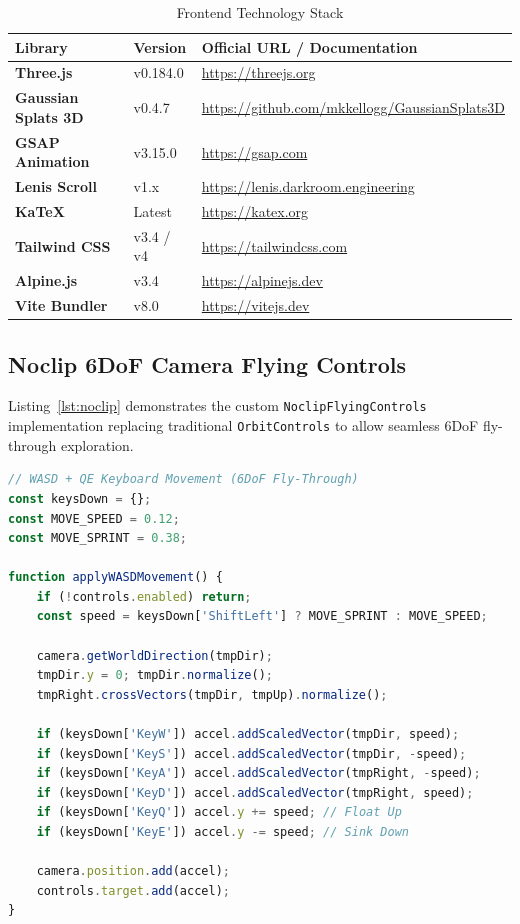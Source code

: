 \documentclass[11pt, a4paper]{article}
\begin{document}
\begin{table}[H]
\centering
\caption{Frontend Technology Stack}
\label{tab:tools_frontend}
\begin{tabularx}{\textwidth}{l l X}
\toprule
\textbf{Library} & \textbf{Version} & \textbf{Official URL / Documentation} \\
\midrule
\textbf{Three.js} & v0.184.0 & \url{https://threejs.org} \\
\textbf{Gaussian Splats 3D} & v0.4.7 & \url{https://github.com/mkkellogg/GaussianSplats3D} \\
\textbf{GSAP Animation} & v3.15.0 & \url{https://gsap.com} \\
\textbf{Lenis Scroll} & v1.x & \url{https://lenis.darkroom.engineering} \\
\textbf{KaTeX} & Latest & \url{https://katex.org} \\
\textbf{Tailwind CSS} & v3.4 / v4 & \url{https://tailwindcss.com} \\
\textbf{Alpine.js} & v3.4 & \url{https://alpinejs.dev} \\
\textbf{Vite Bundler} & v8.0 & \url{https://vitejs.dev} \\
\bottomrule
\end{tabularx}
\end{table}

\subsection{Noclip 6DoF Camera Flying Controls}
Listing~\ref{lst:noclip} demonstrates the custom \texttt{NoclipFlyingControls} implementation replacing traditional \texttt{OrbitControls} to allow seamless 6DoF fly-through exploration.

\begin{lstlisting}[language=JavaScript, caption={Noclip 6DoF Controls Implementation (resources/js/app.js)}, label={lst:noclip}]
// WASD + QE Keyboard Movement (6DoF Fly-Through)
const keysDown = {};
const MOVE_SPEED = 0.12;
const MOVE_SPRINT = 0.38;

function applyWASDMovement() {
    if (!controls.enabled) return;
    const speed = keysDown['ShiftLeft'] ? MOVE_SPRINT : MOVE_SPEED;
    
    camera.getWorldDirection(tmpDir);
    tmpDir.y = 0; tmpDir.normalize();
    tmpRight.crossVectors(tmpDir, tmpUp).normalize();

    if (keysDown['KeyW']) accel.addScaledVector(tmpDir, speed);
    if (keysDown['KeyS']) accel.addScaledVector(tmpDir, -speed);
    if (keysDown['KeyA']) accel.addScaledVector(tmpRight, -speed);
    if (keysDown['KeyD']) accel.addScaledVector(tmpRight, speed);
    if (keysDown['KeyQ']) accel.y += speed; // Float Up
    if (keysDown['KeyE']) accel.y -= speed; // Sink Down

    camera.position.add(accel);
    controls.target.add(accel);
}
\end{lstlisting}
\end{document}
